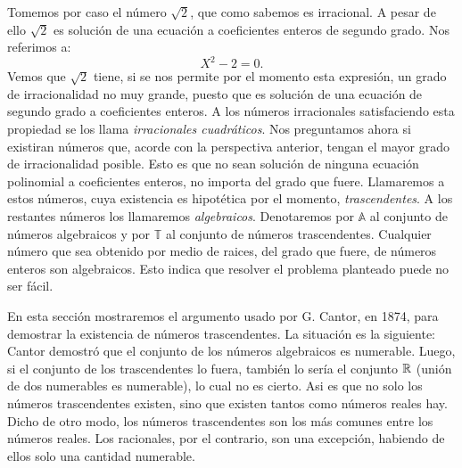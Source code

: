 Tomemos por caso el
número $\sqrt{2}$, que como sabemos es irracional. A pesar de
ello $\sqrt{2}$ es solución de una ecuación a coeficientes
enteros de  segundo grado. Nos referimos a:
\[X^2-2=0.\]
Vemos que $\sqrt{2}$ tiene, si se nos permite por el momento esta
expresión, un grado de irracionalidad no muy grande, puesto
que es solución de una ecuación de segundo grado a
coeficientes enteros. A los números irracionales satisfaciendo esta propiedad se los llama  \emph{irracionales cuadráticos}.
Nos preguntamos ahora si existiran números que, acorde con la perspectiva anterior, tengan el mayor grado
de irracionalidad  posible. Esto es que no sean solución de
ninguna ecuación polinomial a coeficientes enteros, no importa
del grado que fuere. Llamaremos a estos números, cuya existencia
es hipotética por el momento, \emph{trascendentes}. A los
restantes números los llamaremos  \emph{algebraicos}. Denotaremos
por $\mathbb{A}$ al conjunto de números algebraicos y por
$\mathbb{T}$ al conjunto de números trascendentes. Cualquier
número que sea obtenido por medio de raices, del grado que
fuere, de números enteros son algebraicos. Esto indica que
resolver el problema planteado puede no ser fácil.


En esta sección mostraremos el argumento usado por G. Cantor, en
1874, para demostrar la existencia de números trascendentes. La
situación es la siguiente: Cantor demostró que el conjunto de
los números algebraicos es numerable. Luego, si el conjunto de
los trascendentes lo fuera, también lo sería el conjunto
$\mathbb{R}$ (unión de dos numerables es numerable), lo cual no es
cierto. Asi es que no solo los números trascendentes existen,
sino que existen tantos como números reales hay. Dicho de otro
modo, los números trascendentes son los más comunes entre los
números reales. Los racionales, por el contrario, son una
excepción, habiendo de ellos solo una cantidad numerable.


